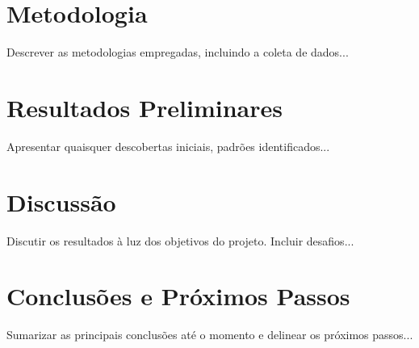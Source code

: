 \documentclass[relatorio,oneside]{iagtese} %
\begin{document}


\titulo %

\assinatura %



\tableofcontents 			%





\chapter{Metodologia}
Descrever as metodologias empregadas, incluindo a coleta de dados...

\chapter{Resultados Preliminares}
Apresentar quaisquer descobertas iniciais, padrões identificados...

\chapter{Discussão}
Discutir os resultados à luz dos objetivos do projeto. Incluir desafios...

\chapter{Conclusões e Próximos Passos}
Sumarizar as principais conclusões até o momento e delinear os próximos passos...

\end{document}
